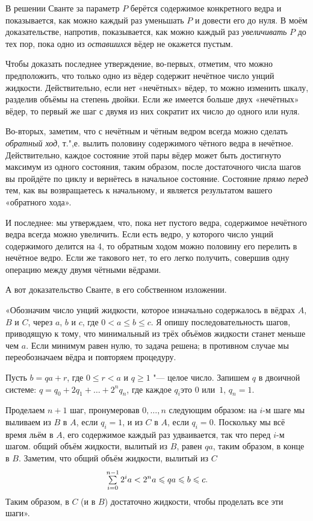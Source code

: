 \documentclass[twoside]{book}
\begin{document}

В решении Сванте за параметр $P$ берётся содержимое конкретного ведра и показывается, как можно каждый раз уменьшать $P$ и довести его до нуля.
В моём доказательстве, напротив, показывается, как можно каждый раз \emph{увеличивать} $P$ до тех пор, пока одно из \emph{оставшихся} вёдер не окажется пустым.

Чтобы доказать последнее утверждение, во-первых, отметим, что можно предположить, что только одно из вёдер содержит нечётное число унций жидкости.
Действительно, если нет «нечётных» вёдер, то можно изменить шкалу, разделив объёмы на степень двойки.
Если же имеется больше двух «нечётных» вёдер, то первый же шаг с двумя из них сократит их число до одного или нуля.

Во-вторых, заметим, что с нечётным и чётным ведром всегда можно сделать \emph{обратный ход}, т.",е. вылить половину содержимого чётного ведра в нечётное.
Действительно, каждое состояние этой пары вёдер может быть достигнуто максимум из одного состояния, таким образом, после достаточного числа шагов вы пройдёте по циклу и вернётесь в начальное состояние.
Состояние \emph{прямо перед} тем, как вы возвращаетесь к начальному, и является результатом вашего «обратного хода».

И последнее: мы утверждаем, что, пока нет пустого ведра, содержимое нечётного ведра всегда можно увеличить.
Если есть ведро, у которого число унций содержимого делится на 4, то обратным ходом можно половину его перелить в нечётное ведро.
Если же такового нет, то его легко получить, совершив одну операцию между двумя чётными вёдрами.
\heart

А вот доказательство Сванте, в его собственном изложении.


«Обозначим число унций жидкости, которое изначально содержалось в вёдрах $A$, $B$ и $C$, через $a$, $b$ и $c$, где $0<a\le b\le c$.
Я опишу последовательность шагов, приводящую к тому, что минимальный из трёх объёмов жидкости станет меньше чем $a$.
Если минимум равен нулю, то задача решена; в противном случае мы переобозначаем вёдра и повторяем процедуру.

Пусть $b = qa + r$, где $0\le r<a$ и $q\ge 1$ "--- целое число.
Запишем $q$ в двоичной системе: $q=q_0+2q_1+\ldots+2^nq_n$, где каждое $q_i$это $0$ или~$1$,  $q_n = 1$.

Проделаем $n+1$ шаг, пронумеровав  $0,\dots, n$ следующим образом: на $i$-м шаге  мы выливаем  из $B$ в $A$, если $q_i = 1$, и из $C$ в $A$, если $q_i = 0$.
Поскольку мы всё время льём  в $A$, его содержимое каждый раз удваивается, так что  перед $i$-м шагом.
 общий объём жидкости, вылитый из $B$, равен $qa$, таким образом, в конце  в $B$.
Заметим, что общий объём жидкости, вылитый из $C$
\[
  \mathop{\textstyle\sum}\limits_{i=0}^{n-1} 2^ia<2^na\leqslant qa\leqslant b\leqslant c.\]
Таким образом, в $C$ (и в $B$) достаточно жидкости, чтобы проделать все эти шаги».
\heart
\end{document}
